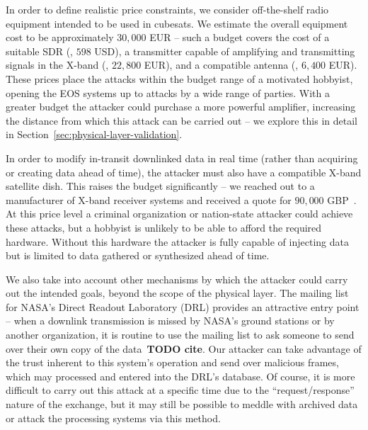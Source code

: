 In order to define realistic price constraints, we consider off-the-shelf radio equipment intended to be used in cubesats.
We estimate the overall equipment cost to be approximately $30,000$ EUR -- such a budget covers the cost of a suitable SDR (\cite{limeSdr,limeCompanion}, $598$ USD), a transmitter capable of amplifying and transmitting signals in the X-band (\cite{endurosat:xbandtransmitter}, $22,800$ EUR), and a compatible antenna (\cite{endurosat:xbandantenna}, $6,400$ EUR).
These prices place the attacks within the budget range of a motivated hobbyist, opening the EOS systems up to attacks by a wide range of parties.
With a greater budget the attacker could purchase a more powerful amplifier, increasing the distance from which this attack can be carried out -- we explore this in detail in Section~\ref{sec:physical-layer-validation}.

In order to modify in-transit downlinked data in real time (rather than acquiring or creating data ahead of time), the attacker must also have a compatible X-band satellite dish.
This raises the budget significantly -- we reached out to a manufacturer of X-band receiver systems and received a quote for $90,000$ GBP~\cite{dartcomsystemsltdXBandOverview2021}.
At this price level a criminal organization or nation-state attacker could achieve these attacks, but a hobbyist is unlikely to be able to afford the required hardware.
Without this hardware the attacker is fully capable of injecting data but is limited to data gathered or synthesized ahead of time.

We also take into account other mechanisms by which the attacker could carry out the intended goals, beyond the scope of the physical layer.
The mailing list for NASA's Direct Readout Laboratory (DRL) provides an attractive entry point -- when a downlink transmission is missed by NASA's ground stations or by another organization, it is routine to use the mailing list to ask someone to send over their own copy of the data~\textbf{TODO cite}. %
Our attacker can take advantage of the trust inherent to this system's operation and send over malicious frames, which may processed and entered into the DRL's database.
Of course, it is more difficult to carry out this attack at a specific time due to the ``request/response'' nature of the exchange, but it may still be possible to meddle with archived data or attack the processing systems via this method.
